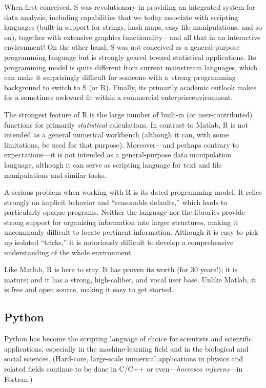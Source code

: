 When first conceived, S was revolutionary in providing an integrated
system for data analysis, including capabilities that we today
associate with scripting languages (built-in support for strings, hash
maps, easy file manipulations, and so on), together with extensive
graphics functionality---and all that in an interactive environment!
On the other hand, S was not conceived as a general-purpose
programming language but is strongly geared toward statistical
applications. Its programming model is quite different from current
mainstream languages, which can make it surprisingly difficult for
someone with a~strong programming background to switch to S (or R).
Finally, its primarily academic outlook makes for a sometimes awkward
fit within a commercial enterprise\break environment.

The strongest feature of R is the large number of built-in (or
user-contributed) functions for primarily \emph{statistical}
calculations.  In contrast to Matlab, R is not intended as a general
numerical workbench (although it can, with some limitations, be used
for that purpose).  Moreover---and perhaps contrary to
expectations---it is not intended as a general-purpose data
manipulation language, although it can serve as scripting language for
text and file manipulations and similar tasks.

A serious problem when working with R is its dated programming model.
It relies strongly on implicit behavior and ``reasonable defaults,''
which leads to particularly opaque programs. Neither the language nor
the libraries provide strong support for organizing information into
larger structures, making it uncommonly difficult to locate pertinent
information.  Although it is easy to pick up isolated ``tricks,'' it
is notoriously difficult to develop a comprehensive understanding of
the whole environment.

Like Matlab, R is here to stay. It has proven its worth (for 30
years!); it is mature; and it has a strong, high-caliber, and vocal
user base. Unlike Matlab, it is free and open source, making it easy
to get started.


\subsection{Python}


Python has become the scripting language of choice for scientists and
scientific applications, especially in the machine-learning field and in
the biological and social sciences. (Hard-core, large-scale numerical
applications in physics and related fields continue to be done in
C/C++ or even---\textit{horresco referens}---in Fortran.)

